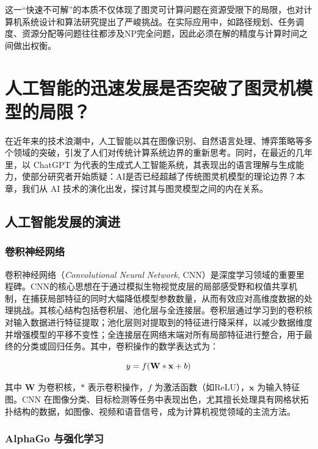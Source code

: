 \documentclass[UTF8,openany,zihao=5]{ctexbook}
\begin{document}
这一“快速不可解”的本质不仅体现了图灵可计算问题在资源受限下的局限，也对计算机系统设计和算法研究提出了严峻挑战。在实际应用中，如路径规划、任务调度、资源分配等问题往往都涉及NP完全问题，因此必须在解的精度与计算时间之间做出权衡。

\chapter{人工智能的迅速发展是否突破了图灵机模型的局限？}
\label{sec:AI_breakthrough}

在近年来的技术浪潮中，人工智能以其在图像识别、自然语言处理、博弈策略等多个领域的突破，引发了人们对传统计算系统边界的重新思考。同时，在最近的几年里，以 ChatGPT 为代表的生成式人工智能系统，其表现出的语言理解与生成能力，使部分研究者开始质疑：AI是否已经超越了传统图灵机模型的理论边界？本章，我们从 AI 技术的演化出发，探讨其与图灵模型之间的内在关系。

\section{人工智能发展的演进}
\subsection{卷积神经网络}

卷积神经网络（\textit{Convolutional Neural Network}\cite{lecun2002gradient}, CNN）是深度学习领域的重要里程碑。CNN的核心思想在于通过模拟生物视觉皮层的局部感受野和权值共享机制，在捕获局部特征的同时大幅降低模型参数数量，从而有效应对高维度数据的处理挑战。其核心结构包括卷积层、池化层与全连接层。卷积层通过学习到的卷积核对输入数据进行特征提取；池化层则对提取到的特征进行降采样，以减少数据维度并增强模型的平移不变性；全连接层在网络末端对所有局部特征进行整合，用于最终的分类或回归任务。其中，卷积操作的数学表达式为：

\begin{equation}\vspace{-4ex}
y = f(\mathbf{W} * \mathbf{x} + b)
\end{equation}\vspace{-1ex}

其中 $\mathbf{W}$ 为卷积核，$*$ 表示卷积操作，$f$ 为激活函数（如ReLU），$\mathbf{x}$ 为输入特征图。CNN 在图像分类、目标检测等任务中表现出色，尤其擅长处理具有网格状拓扑结构的数据，如图像、视频和语音信号，成为计算机视觉领域的主流方法。

\subsection{AlphaGo 与强化学习}
\end{document}
